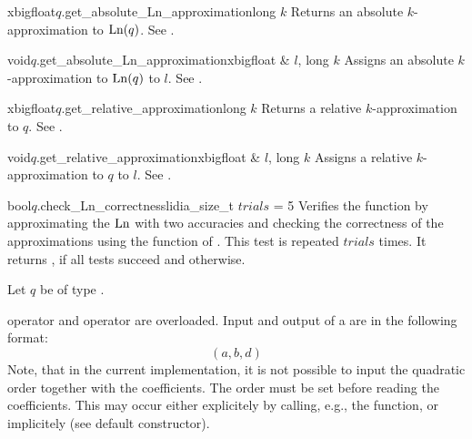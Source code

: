 \begin{cfcode}{xbigfloat}{$q$.get_absolute_Ln_approximation}{long $k$}
  Returns an absolute $k$-approximation to $\operatorname{Ln}(q)$.  See .
\end{cfcode}

\begin{cfcode}{void}{$q$.get_absolute_Ln_approximation}{xbigfloat & $l$, long $k$}
  Assigns an absolute $k$-approximation to $\operatorname{Ln}(q)$ to $l$.  See .
\end{cfcode}

\begin{cfcode}{xbigfloat}{$q$.get_relative_approximation}{long $k$}
  Returns a relative $k$-approximation to $q$.  See .
\end{cfcode}

\begin{cfcode}{void}{$q$.get_relative_approximation}{xbigfloat & $l$, long $k$}
  Assigns a relative $k$-approximation to $q$ to $l$.  See .
\end{cfcode}


\begin{cfcode}{bool}{$q$.check_Ln_correctness}{lidia_size_t $\mathit{trials}$ = 5}
  Verifies the function  by approximating the $\operatorname{Ln}$ with
  two accuracies and checking the correctness of the approximations using the function
   of .  This test is repeated
  $\mathit{trials}$ times.  It returns \TRUE, if all tests succeed and \FALSE otherwise.
\end{cfcode}



\IO

Let $q$ be of type .

 operator \code{>>} and  operator \code{<<} are overloaded.  Input
and output of a  are in the following format:
\begin{displaymath}
  (a,b,d)
\end{displaymath}
Note, that in the current implementation, it is not possible to input the quadratic order
together with the coefficients.  The order must be set before reading the coefficients.  This
may occur either explicitely by calling, e.g., the  function, or implicitely
(see default constructor).

